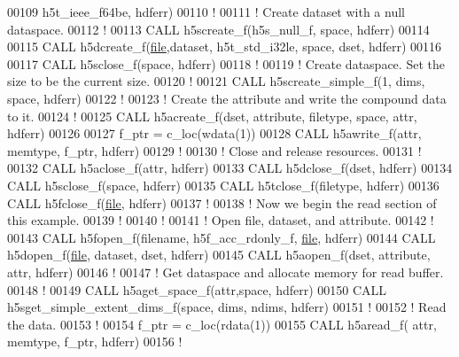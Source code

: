 \begin{DoxyCode}
00109        h5t\_ieee\_f64be, hdferr)
00110   \textcolor{comment}{!}
00111   \textcolor{comment}{! Create dataset with a null dataspace.}
00112   \textcolor{comment}{!}
00113   \textcolor{keyword}{CALL }h5screate\_f(h5s\_null\_f, space, hdferr)
00114 
00115   \textcolor{keyword}{CALL }h5dcreate\_f(\hyperlink{structfile}{file},dataset, h5t\_std\_i32le, space, dset, hdferr)
00116 
00117   \textcolor{keyword}{CALL }h5sclose\_f(space, hdferr)
00118   \textcolor{comment}{!}
00119   \textcolor{comment}{! Create dataspace.  Set the size to be the current size.}
00120   \textcolor{comment}{!}
00121   \textcolor{keyword}{CALL }h5screate\_simple\_f(1, dims, space, hdferr)
00122   \textcolor{comment}{!}
00123   \textcolor{comment}{! Create the attribute and write the compound data to it.}
00124   \textcolor{comment}{!}
00125   \textcolor{keyword}{CALL }h5acreate\_f(dset, attribute, filetype, space, attr, hdferr)
00126 
00127   f\_ptr = c\_loc(wdata(1))
00128   \textcolor{keyword}{CALL }h5awrite\_f(attr, memtype, f\_ptr, hdferr)
00129   \textcolor{comment}{!}
00130   \textcolor{comment}{! Close and release resources.}
00131   \textcolor{comment}{!}
00132   \textcolor{keyword}{CALL }h5aclose\_f(attr, hdferr)
00133   \textcolor{keyword}{CALL }h5dclose\_f(dset, hdferr)
00134   \textcolor{keyword}{CALL }h5sclose\_f(space, hdferr)
00135   \textcolor{keyword}{CALL }h5tclose\_f(filetype, hdferr)
00136   \textcolor{keyword}{CALL }h5fclose\_f(\hyperlink{structfile}{file}, hdferr)
00137   \textcolor{comment}{!}
00138   \textcolor{comment}{! Now we begin the read section of this example.}
00139   \textcolor{comment}{!}
00140   \textcolor{comment}{!}
00141   \textcolor{comment}{! Open file, dataset, and attribute.}
00142   \textcolor{comment}{!}
00143   \textcolor{keyword}{CALL }h5fopen\_f(filename, h5f\_acc\_rdonly\_f, \hyperlink{structfile}{file}, hdferr)
00144   \textcolor{keyword}{CALL }h5dopen\_f(\hyperlink{structfile}{file}, dataset, dset, hdferr)
00145   \textcolor{keyword}{CALL }h5aopen\_f(dset, attribute, attr, hdferr)
00146   \textcolor{comment}{!}
00147   \textcolor{comment}{! Get dataspace and allocate memory for read buffer.}
00148   \textcolor{comment}{!}
00149   \textcolor{keyword}{CALL }h5aget\_space\_f(attr,space, hdferr)
00150   \textcolor{keyword}{CALL }h5sget\_simple\_extent\_dims\_f(space, dims, ndims, hdferr)
00151   \textcolor{comment}{!}
00152   \textcolor{comment}{! Read the data.}
00153   \textcolor{comment}{!}
00154   f\_ptr = c\_loc(rdata(1))
00155   \textcolor{keyword}{CALL }h5aread\_f( attr, memtype, f\_ptr, hdferr)
00156   \textcolor{comment}{!}

\end{DoxyCode}
